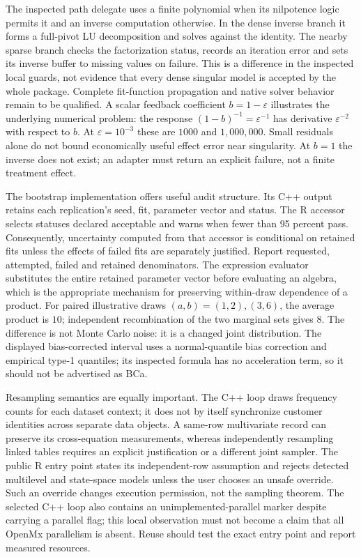 The inspected path delegate uses a finite polynomial when its nilpotence logic
permits it and an inverse computation otherwise. In the dense inverse branch it
forms a full-pivot LU decomposition and solves against the identity. The nearby
sparse branch checks the factorization status, records an iteration error and
sets its inverse buffer to missing values on failure. This is a difference in
the inspected local guards, not evidence that every dense singular model is
accepted by the whole package. Complete fit-function propagation and native
solver behavior remain to be qualified. A scalar feedback coefficient
$b=1-\varepsilon$ illustrates the underlying numerical problem: the response
$(1-b)^{-1}=\varepsilon^{-1}$ has derivative $\varepsilon^{-2}$ with respect
to $b$. At $\varepsilon=10^{-3}$ these are $1000$ and $1{,}000{,}000$.
Small residuals alone do not bound economically useful effect error near
singularity. At $b=1$ the inverse does not exist; an adapter must return an
explicit failure, not a finite treatment effect.~\citep{exec25_cmed_openmx,exec25_cmed_choice}

The bootstrap implementation offers useful audit structure. Its C++ output
retains each replication's seed, fit, parameter vector and status. The R accessor
selects statuses declared acceptable and warns when fewer than 95 percent pass.
Consequently, uncertainty computed from that accessor is conditional on retained
fits unless the effects of failed fits are separately justified. Report requested,
attempted, failed and retained denominators. The expression evaluator substitutes
the entire retained parameter vector before evaluating an algebra, which is the
appropriate mechanism for preserving within-draw dependence of a product.
For paired illustrative draws $(a,b)=(1,2),(3,6)$, the average product is $10$;
independent recombination of the two marginal sets gives $8$. The difference is
not Monte Carlo noise: it is a changed joint distribution. The displayed
bias-corrected interval uses a normal-quantile bias correction and empirical
type-1 quantiles; its inspected formula has no acceleration term, so it should
not be advertised as BCa.~\citep{exec25_cmed_openmx,exec25_cmed_choice}

Resampling semantics are equally important. The C++ loop draws frequency counts
for each dataset context; it does not by itself synchronize customer identities
across separate data objects. A same-row multivariate record can preserve its
cross-equation measurements, whereas independently resampling linked tables
requires an explicit justification or a different joint sampler. The public R
entry point states its independent-row assumption and rejects detected multilevel
and state-space models unless the user chooses an unsafe override. Such an
override changes execution permission, not the sampling theorem. The selected
C++ loop also contains an unimplemented-parallel marker despite carrying a
parallel flag; this local observation must not become a claim that all OpenMx
parallelism is absent. Reuse should test the exact entry point and report measured
resources.~\citep{exec25_cmed_openmx}

